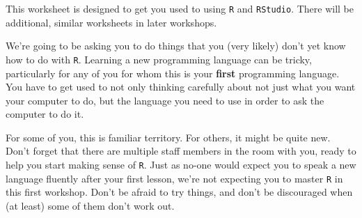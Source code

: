 \documentclass[11pt,a4paper]{article}
\begin{document}

\setcounter{section}{1}

\setcounter{aufg}{0}


This worksheet is designed to get you used to using \texttt{R} and \texttt{RStudio}. There will be additional, similar worksheets in later workshops.

We're going to be asking you to do things that you (very likely) don't yet know how to do with \texttt{R}. Learning a new programming language can be tricky, particularly for any of you for whom this is your \textbf{first} programming language. You have to get used to not only thinking carefully about not just what you want your computer to do, but the language you need to use in order to ask the computer to do it.

For some of you, this is familiar territory. For others, it might be quite new. Don't forget that there are multiple staff members in the room with you, ready to help you start making sense of \texttt{R}. Just as no-one would expect you to speak a new language fluently after your first lesson, we're not expecting you to master \texttt{R} in this first workshop. Don't be afraid to try things, and don't be discouraged when (at least) some of them don't work out.

\vspace{0.4cm}
\end{document}
